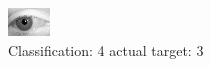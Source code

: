 \begin{figure}[h!]
\begin{center}
\includegraphics[width=0.60\columnwidth]{figures/ID2821_class_4_target_3.png}
\end{center}
\caption{ Classification: 4 actual target: 3}
\label{fig:ID2821_class_4_target_3}
\end{figure}
